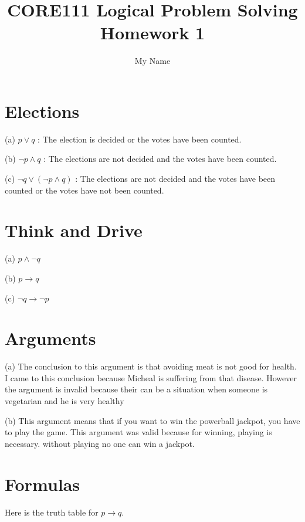 \documentclass{article}
\title{CORE111 Logical Problem Solving\\Homework 1}
\author{My Name}
\begin{document}
\maketitle

\section{Elections}

(a) $p\vee q$ : The election is decided or the votes have been counted.

(b) $\neg p \wedge q$ : The elections are not decided and the votes have been counted.

(c) $\neg q\vee (\neg p \wedge q)$ : The elections are not decided and the votes have been counted or the votes have not been counted.

\section{Think and Drive}

(a) $p \wedge \neg q$

(b) $p \rightarrow q$

(c) $\neg q \rightarrow \neg p$

\section{Arguments}

(a) The conclusion to this argument is that avoiding meat is not good for health. I came to this conclusion because Micheal is suffering from that disease. However the argument is invalid because their can be a situation when someone is vegetarian and he is very healthy

(b) This argument means that if you want to win the powerball jackpot, you have to play the game. This argument was valid because for winning, playing is necessary. without playing no one can win a jackpot.

\section{Formulas}

Here is the truth table for $p\rightarrow q$.
\end{document}
